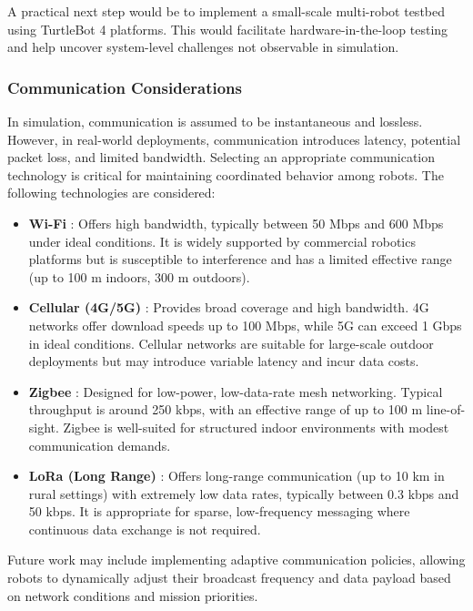 A practical next step would be to implement a small-scale multi-robot testbed using TurtleBot 4 platforms. This would facilitate hardware-in-the-loop testing and help uncover system-level challenges not observable in simulation.

\subsubsection{Communication Considerations}
\label{sub:communication-methods}

In simulation, communication is assumed to be instantaneous and lossless. However, in real-world deployments, communication introduces latency, potential packet loss, and limited bandwidth. Selecting an appropriate communication technology is critical for maintaining coordinated behavior among robots. The following technologies are considered:

\begin{itemize}
  \item \textbf{Wi-Fi} \cite{wifi}: Offers high bandwidth, typically between 50 Mbps and 600 Mbps under ideal conditions. It is widely supported by commercial robotics platforms but is susceptible to interference and has a limited effective range (up to 100 m indoors, 300 m outdoors).
  \item \textbf{Cellular (4G/5G)} \cite{cellular}: Provides broad coverage and high bandwidth. 4G networks offer download speeds up to 100 Mbps, while 5G can exceed 1 Gbps in ideal conditions. Cellular networks are suitable for large-scale outdoor deployments but may introduce variable latency and incur data costs.
  \item \textbf{Zigbee} \cite{zigbee}: Designed for low-power, low-data-rate mesh networking. Typical throughput is around 250 kbps, with an effective range of up to 100 m line-of-sight. Zigbee is well-suited for structured indoor environments with modest communication demands.
  \item \textbf{LoRa (Long Range)} \cite{lora}: Offers long-range communication (up to 10 km in rural settings) with extremely low data rates, typically between 0.3 kbps and 50 kbps. It is appropriate for sparse, low-frequency messaging where continuous data exchange is not required.
\end{itemize}

Future work may include implementing adaptive communication policies, allowing robots to dynamically adjust their broadcast frequency and data payload based on network conditions and mission priorities.

